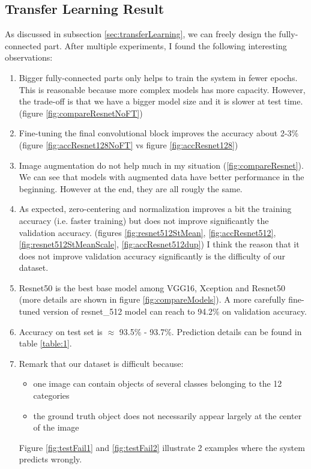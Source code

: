 \subsection{Transfer Learning Result}
\label{sec:transLearnEval}
As discussed in subsection \ref{sec:transferLearning}, we can freely design the fully-connected part. After multiple experiments, I found the following interesting observations:
\begin{enumerate}
	\item Bigger fully-connected parts only helps to train the system in fewer epochs. This is reasonable because more complex models has more capacity. However, the trade-off is that we have a bigger model size and it is slower at test time. (figure \ref{fig:compareResnetNoFT})
	\item Fine-tuning the final convolutional block improves the accuracy about 2-3\% (figure \ref{fig:accResnet128NoFT} vs figure \ref{fig:accResnet128})
	\item Image augmentation do not help much in my situation (\ref{fig:compareResnet}). We can see that models with augmented data have better performance in the beginning. However at the end, they are all rougly the same.
	\item As expected, zero-centering and normalization improves a bit the training accuracy (i.e. faster training) but does not improve significantly the validation accuracy. (figures \ref{fig:resnet512StMean}, \ref{fig:accResnet512}, \ref{fig:resnet512StMeanScale}, \ref{fig:accResnet512dup}) I think the reason that it does not improve validation accuracy significantly is the difficulty of our dataset.
	\item Resnet50 is the best base model among VGG16, Xception and Resnet50 (more details are shown in figure \ref{fig:compareModels}). A more carefully fine-tuned version of resnet\_512 model can reach to 94.2\% on validation accuracy.
	\item Accuracy on test set is $\approx$ 93.5\% - 93.7\%. Prediction details can be found in table \ref{table:1}. 
	\item Remark that our dataset is difficult because:
	\begin{itemize}
		\item one image can contain objects of several classes belonging to the 12 categories
		\item the ground truth object does not necessarily appear largely at the center of the image
	\end{itemize}
	Figure \ref{fig:testFail1} and \ref{fig:testFail2} illustrate 2 examples where the system predicts wrongly.
\end{enumerate}
	

